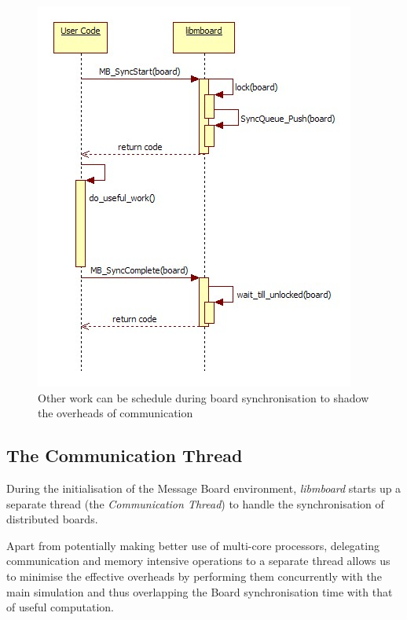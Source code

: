 \begin{figure}[h]
 \centering
  \includegraphics[scale=0.60]{syncboard.jpg}
 \caption{Other work can be schedule during board synchronisation to shadow the overheads of communication}
 \label{fig:syncboard}
\end{figure}

\subsection{The Communication Thread}
\label{sec:commthread}

During the initialisation of the Message Board environment, \textit{libmboard} starts up a separate thread (the \textit{Communication Thread}) to handle the synchronisation of distributed boards. 

Apart from potentially making better use of multi-core processors, delegating communication and memory intensive operations to a separate thread allows us to minimise the effective overheads by performing them concurrently with the main simulation and thus overlapping the Board synchronisation time with that of useful computation.

